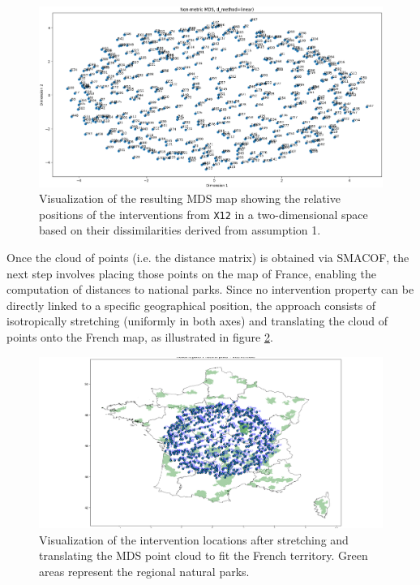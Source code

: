 \begin{figure}[!ht]
    \centering
    \includegraphics[width=\textwidth]{ch3/figures/points.png}
    \caption{Visualization of the resulting MDS map showing the relative positions of the interventions from \texttt{X12} in a two-dimensional space based on their dissimilarities derived from assumption 1.}
    \label{fig:mds_map}
\end{figure}

Once the cloud of points (i.e. the distance matrix) is obtained via SMACOF, the next step involves placing those points on the map of France, enabling the computation of distances to national parks. Since no intervention property can be directly linked to a specific geographical position, the approach consists of isotropically stretching (uniformly in both axes) and translating the cloud of points onto the French map, as illustrated in figure \ref{fig:map_france}.

\begin{figure}[!ht]
    \centering
    \includegraphics[width=\textwidth]{ch3/figures/Map of France.png}
    \caption{Visualization of the intervention locations after stretching and translating the MDS point cloud to fit the French territory. Green areas represent the regional natural parks.}
    \label{fig:map_france}
\end{figure}


